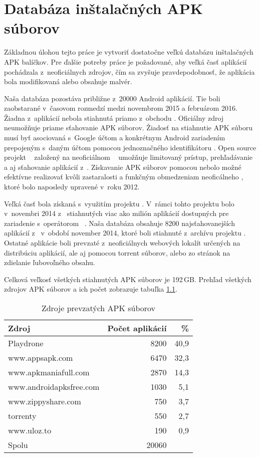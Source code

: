 \chapter{Databáza inštalačných APK súborov}
Základnou úlohou tejto práce je vytvoriť dostatočne veľkú databázu inštalačných APK balíčkov. Pre ďalšie potreby práce je požadované, aby veľká časť aplikácií pochádzala z~neoficiálnych zdrojov, čím sa zvyšuje pravdepodobnosť, že aplikácia bola modifikovaná alebo obsahuje malvér.

Naša databáza pozostáva približne z~20000 Android aplikácií. Tie boli zaobstarané v~časovom rozmedzí medzi novembrom 2015 a februárom 2016. Žiadna z~aplikácií nebola stiahnutá priamo z~obchodu . Oficiálny zdroj  neumožňuje priame sťahovanie APK súborov. Žiadosť na stiahnutie APK súboru musí byť asociovaná s~Google účtom a konkrétnym Android zariadením prepojeným s~daným účtom pomocou jednoznačného identifikátoru . Open source projekt ~\cite{gpCrawler} založený na neoficiálnom ~\cite{gpApi} umožňuje limitovaný prístup, prehľadávanie a aj sťahovanie aplikácií z~. Získavanie APK súborov pomocou  nebolo možné efektívne realizovať kvôli zastaralosti a funkčným obmedzeniam neoficálneho , ktoré bolo naposledy upravené v~roku 2012.

Veľká časť bola získaná s~využitím projektu . V~rámci tohto projektu bolo v~novembri 2014 z~ stiahnutých viac ako milión aplikácií dostupných pre zariadenie  s~operátorom ~\cite{Viennot2014}. Naša databáza obsahuje 8200 najsťahovanejších aplikácií z~ v~období november 2014, ktoré boli stiahnuté z~archívu projektu . Ostatné aplikácie boli prevzaté z~neoficiálnych webových lokalít určených na distribúciu aplikácií, ale aj pomocou torrent súborov, alebo zo stránok na zdielanie ľubovoľného obsahu.

Celková veľkosť všetkých stiahnutých APK súborov je 192\,GB. Prehľad všetkých zdrojov APK súborov a ich počet zobrazuje tabuľka \ref{tab:stahovanie}. 

\begin{table}[htb]
\centering
  \begin{tabular}{|l r r|}
    \hline
    \textbf{Zdroj} & \textbf{Počet aplikácií} & \textbf{\%} \\\hline\hline
    Playdrone & 8200 & 40,9\\
    www.appsapk.com & 6470 & 32,3\\
    www.apkmaniafull.com & 2870 & 14,3\\
    www.androidapksfree.com & 1030 & 5,1\\
    www.zippyshare.com & 750 & 3,7\\
    torrenty & 550 & 2,7\\
    www.uloz.to & 190 & 0,9\\
    \midrule\hline
    Spolu & 20060 & \\
    \hline
  \end{tabular}
  \caption{Zdroje prevzatých APK súborov}
  \label{tab:stahovanie}
\end{table}


